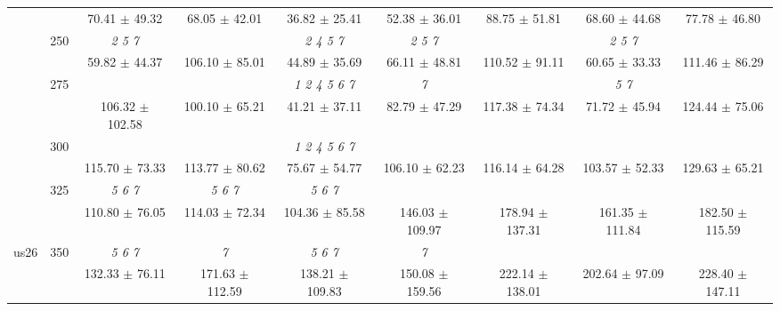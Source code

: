 \begin{table}[h]
{\begin{tabular}{
        ccccccccc}
 & & \cellcolor[HTML]{EFEFEF} 70.41 $\pm$ 49.32& \cellcolor[HTML]{EFEFEF} 68.05 $\pm$ 42.01& \cellcolor[HTML]{EFEFEF} 36.82 $\pm$ 25.41& \cellcolor[HTML]{EFEFEF} 52.38 $\pm$ 36.01& \cellcolor[HTML]{EFEFEF} 88.75 $\pm$ 51.81& \cellcolor[HTML]{EFEFEF} 68.60 $\pm$ 44.68& \cellcolor[HTML]{EFEFEF} 77.78 $\pm$ 46.80 \\ 
 & \multirow{2}{*}{250}& \textit{ 2 5 7 }& & \textit{ 2 4 5 7 }& \textit{ 2 5 7 }& & \textit{ 2 5 7 }&  \\ 
 & & 59.82 $\pm$ 44.37& 106.10 $\pm$ 85.01& 44.89 $\pm$ 35.69& 66.11 $\pm$ 48.81& 110.52 $\pm$ 91.11& 60.65 $\pm$ 33.33& 111.46 $\pm$ 86.29 \\ 
 & \multirow{2}{*}{275}& \cellcolor[HTML]{EFEFEF} & \cellcolor[HTML]{EFEFEF} & \cellcolor[HTML]{EFEFEF} \textit{ 1 2 4 5 6 7 }& \cellcolor[HTML]{EFEFEF} \textit{ 7 }& \cellcolor[HTML]{EFEFEF} & \cellcolor[HTML]{EFEFEF} \textit{ 5 7 }& \cellcolor[HTML]{EFEFEF}  \\ 
 & & \cellcolor[HTML]{EFEFEF} 106.32 $\pm$ 102.58& \cellcolor[HTML]{EFEFEF} 100.10 $\pm$ 65.21& \cellcolor[HTML]{EFEFEF} 41.21 $\pm$ 37.11& \cellcolor[HTML]{EFEFEF} 82.79 $\pm$ 47.29& \cellcolor[HTML]{EFEFEF} 117.38 $\pm$ 74.34& \cellcolor[HTML]{EFEFEF} 71.72 $\pm$ 45.94& \cellcolor[HTML]{EFEFEF} 124.44 $\pm$ 75.06 \\ 
 & \multirow{2}{*}{300}& & & \textit{ 1 2 4 5 6 7 }& & & &  \\ 
 & & 115.70 $\pm$ 73.33& 113.77 $\pm$ 80.62& 75.67 $\pm$ 54.77& 106.10 $\pm$ 62.23& 116.14 $\pm$ 64.28& 103.57 $\pm$ 52.33& 129.63 $\pm$ 65.21 \\ 
 & \multirow{2}{*}{325}& \cellcolor[HTML]{EFEFEF} \textit{ 5 6 7 }& \cellcolor[HTML]{EFEFEF} \textit{ 5 6 7 }& \cellcolor[HTML]{EFEFEF} \textit{ 5 6 7 }& \cellcolor[HTML]{EFEFEF} & \cellcolor[HTML]{EFEFEF} & \cellcolor[HTML]{EFEFEF} & \cellcolor[HTML]{EFEFEF}  \\ 
 & & \cellcolor[HTML]{EFEFEF} 110.80 $\pm$ 76.05& \cellcolor[HTML]{EFEFEF} 114.03 $\pm$ 72.34& \cellcolor[HTML]{EFEFEF} 104.36 $\pm$ 85.58& \cellcolor[HTML]{EFEFEF} 146.03 $\pm$ 109.97& \cellcolor[HTML]{EFEFEF} 178.94 $\pm$ 137.31& \cellcolor[HTML]{EFEFEF} 161.35 $\pm$ 111.84& \cellcolor[HTML]{EFEFEF} 182.50 $\pm$ 115.59 \\ 
 \multirow{4}{*}{us26} & \multirow{2}{*}{350}& \textit{ 5 6 7 }& \textit{ 7 }& \textit{ 5 6 7 }& \textit{ 7 }& & &  \\ 
 & & 132.33 $\pm$ 76.11& 171.63 $\pm$ 112.59& 138.21 $\pm$ 109.83& 150.08 $\pm$ 159.56& 222.14 $\pm$ 138.01& 202.64 $\pm$ 97.09& 228.40 $\pm$ 147.11 \\ 

\end{tabular}}
\end{table}
